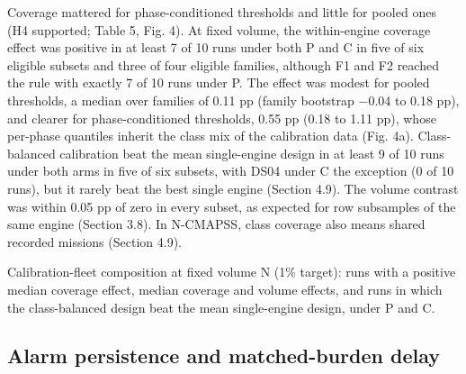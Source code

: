 \documentclass[preprint,11pt,a4paper]{elsarticle}
\begin{document}
Coverage mattered for phase-conditioned thresholds and little for pooled ones (H4 supported; Table 5, Fig. 4). At fixed volume, the within-engine coverage effect was positive in at least 7 of 10 runs under both P and C in five of six eligible subsets and three of four eligible families, although F1 and F2 reached the rule with exactly 7 of 10 runs under P. The effect was modest for pooled thresholds, a median over families of 0.11 pp (family bootstrap −0.04 to 0.18 pp), and clearer for phase-conditioned thresholds, 0.55 pp (0.18 to 1.11 pp), whose per-phase quantiles inherit the class mix of the calibration data (Fig. 4a). Class-balanced calibration beat the mean single-engine design in at least 9 of 10 runs under both arms in five of six subsets, with DS04 under C the exception (0 of 10 runs), but it rarely beat the best single engine (Section 4.9). The volume contrast was within 0.05 pp of zero in every subset, as expected for row subsamples of the same engine (Section 3.8). In N-CMAPSS, class coverage also means shared recorded missions (Section 4.9).
\begin{table}[htbp]
\centering
\small
\caption{Calibration-fleet composition at fixed volume N (1\% target): runs with a positive median coverage effect, median coverage and volume effects, and runs in which the class-balanced design beat the mean single-engine design, under P and C.}
\label{tab:5}
\begin{adjustbox}{max width=\textwidth}

\end{adjustbox}
\end{table}

\subsection{Alarm persistence and matched-burden delay}
\end{document}
